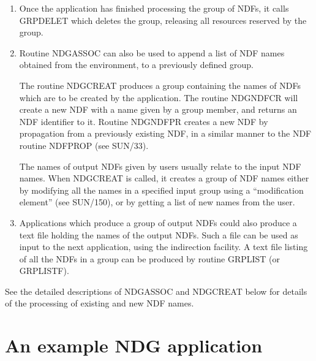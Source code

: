 \documentclass[twoside,11pt]{article}
\newcommand{\htmlref}[2]{#1}
\newcommand{\xref}[3]{#1}
\renewcommand{\_}{\texttt{\symbol{95}}}
\begin{document}
\begin{enumerate}
\item Once the application has finished processing the group of NDFs, it calls
\xref{GRP\_DELET}{sun150}{GRP\_DELET} which deletes the group, releasing all resources reserved by the group.

\item Routine NDG\_ASSOC can also be used to append a list of NDF names
obtained from the environment, to a previously defined group.

The routine \htmlref{NDG\_CREAT}{NDG\_CREAT} produces a group containing the names of
NDFs which are to be created by the application. The routine \htmlref{NDG\_NDFCR}{NDG\_NDFCR} will
create a new NDF with a name given by a group member, and returns an NDF
identifier to it. Routine \htmlref{NDG\_NDFPR}{NDG\_NDFPR} creates a new NDF by propagation from a
previously existing NDF, in a similar manner to the NDF routine \xref{NDF\_PROP}{sun33}{NDF\_PROP} (see
\xref{SUN/33}{sun33}{}).

The names of output NDFs given by users usually relate to the input NDF names.
When NDG\_CREAT is called, it creates a group of NDF names either by modifying
all the names in a specified input group using a ``modification element'' (see
\xref{SUN/150}{sun150}{}), or by getting a list of new names from the user.

\item Applications which produce a group of output NDFs could also produce a
text file holding the names of the output NDFs. Such a file can be used
as input to the next application, using the indirection facility. A text
file listing of all the NDFs in a group can be produced by routine
GRP\_LIST (or GRP\_LISTF).

\end{enumerate}

See the detailed descriptions of \htmlref{NDG\_ASSOC}{NDG\_ASSOC} and \htmlref{NDG\_CREAT}{NDG\_CREAT} below for details
of the processing of existing and new NDF names.

\section{An example NDG application}
\end{document}

